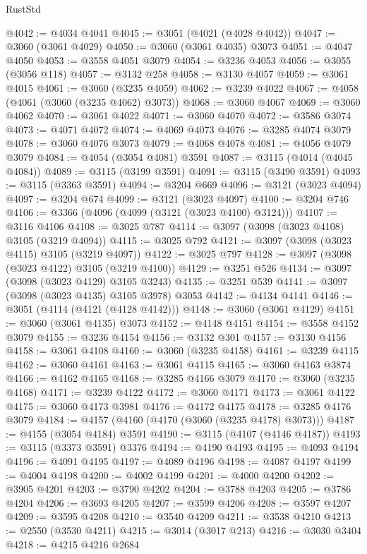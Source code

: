 \begin{lexlean}{RustStd}
\begin{coremodule}
@4042 := @4034 @4041
@4045 := @3051 (@4021 (@4028 @4042))
@4047 := @3060 (@3061 @4029)
@4050 := @3060 (@3061 @4035) @3073
@4051 := @4047 @4050
@4053 := @3558 @4051 @3079
@4054 := @3236 @4053
@4056 := @3055 (@3056 @118)
@4057 := @3132 @258
@4058 := @3130 @4057
@4059 := @3061 @4015
@4061 := @3060 (@3235 @4059)
@4062 := @3239 @4022
@4067 := @4058 (@4061 (@3060 (@3235 @4062) @3073))
@4068 := @3060 @4067
@4069 := @3060 @4062
@4070 := @3061 @4022
@4071 := @3060 @4070
@4072 := @3586 @3074
@4073 := @4071 @4072
@4074 := @4069 @4073
@4076 := @3285 @4074 @3079
@4078 := @3060 @4076 @3073
@4079 := @4068 @4078
@4081 := @4056 @4079 @3079
@4084 := @4054 (@3054 @4081) @3591
@4087 := @3115 (@4014 (@4045 @4084))
@4089 := @3115 (@3199 @3591)
@4091 := @3115 (@3490 @3591)
@4093 := @3115 (@3363 @3591)
@4094 := @3204 @669
@4096 := @3121 (@3023 @4094)
@4097 := @3204 @674
@4099 := @3121 (@3023 @4097)
@4100 := @3204 @746
@4106 := @3366 (@4096 (@4099 (@3121 (@3023 @4100) @3124)))
@4107 := @3116 @4106
@4108 := @3025 @787
@4114 := @3097 (@3098 (@3023 @4108) @3105 (@3219 @4094))
@4115 := @3025 @792
@4121 := @3097 (@3098 (@3023 @4115) @3105 (@3219 @4097))
@4122 := @3025 @797
@4128 := @3097 (@3098 (@3023 @4122) @3105 (@3219 @4100))
@4129 := @3251 @526
@4134 := @3097 (@3098 (@3023 @4129) @3105 @3243)
@4135 := @3251 @539
@4141 := @3097 (@3098 (@3023 @4135) @3105 @3978) @3053
@4142 := @4134 @4141
@4146 := @3051 (@4114 (@4121 (@4128 @4142)))
@4148 := @3060 (@3061 @4129)
@4151 := @3060 (@3061 @4135) @3073
@4152 := @4148 @4151
@4154 := @3558 @4152 @3079
@4155 := @3236 @4154
@4156 := @3132 @301
@4157 := @3130 @4156
@4158 := @3061 @4108
@4160 := @3060 (@3235 @4158)
@4161 := @3239 @4115
@4162 := @3060 @4161
@4163 := @3061 @4115
@4165 := @3060 @4163 @3874
@4166 := @4162 @4165
@4168 := @3285 @4166 @3079
@4170 := @3060 (@3235 @4168)
@4171 := @3239 @4122
@4172 := @3060 @4171
@4173 := @3061 @4122
@4175 := @3060 @4173 @3981
@4176 := @4172 @4175
@4178 := @3285 @4176 @3079
@4184 := @4157 (@4160 (@4170 (@3060 (@3235 @4178) @3073)))
@4187 := @4155 (@3054 @4184) @3591
@4190 := @3115 (@4107 (@4146 @4187))
@4193 := @3115 (@3373 @3591) @3376
@4194 := @4190 @4193
@4195 := @4093 @4194
@4196 := @4091 @4195
@4197 := @4089 @4196
@4198 := @4087 @4197
@4199 := @4004 @4198
@4200 := @4002 @4199
@4201 := @4000 @4200
@4202 := @3905 @4201
@4203 := @3790 @4202
@4204 := @3788 @4203
@4205 := @3786 @4204
@4206 := @3693 @4205
@4207 := @3599 @4206
@4208 := @3597 @4207
@4209 := @3595 @4208
@4210 := @3540 @4209
@4211 := @3538 @4210
@4213 := @2550 (@3530 @4211)
@4215 := @3014 (@3017 @213)
@4216 := @3030 @3404
@4218 := @4215 @4216 @2684

\end{coremodule}
\end{lexlean}

